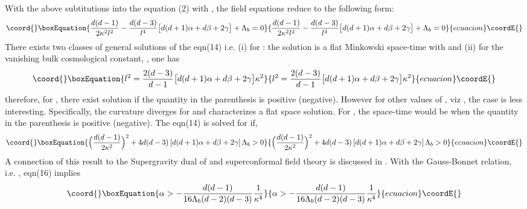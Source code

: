 \documentclass[a4paper,12pt]{article}
\begin{document}
With the above subtitutions into the equation (2) with \coordHE{}, 
the field equations reduce to the following form:
\begin{equation}\coord{}\boxEquation{
\frac{d(d-1)}{2\kappa^2 l^2}-\frac{d(d-3)}{l^4} \big[ d(d+1)\alpha+
d\beta+2\gamma \big]+\Lambda_b=0
}{
\frac{d(d-1)}{2\kappa^2 l^2}-\frac{d(d-3)}{l^4} \big[ d(d+1)\alpha+
d\beta+2\gamma \big]+\Lambda_b=0
}{ecuacion}\coordE{}\end{equation}
There exists two classes of general solutions of the eqn(14) i.e. 
(i) for \coordHE{} : the solution is a flat Minkowski space-time with 
\coordHE{} and
(ii) for the vanishing bulk cosmological constant, \coordHE{}, one has
\begin{equation}\coord{}\boxEquation{
l^2=\frac{2(d-3)}{d-1}\big[d(d+1)\alpha+d\beta+2\gamma\big]\kappa^2
}{
l^2=\frac{2(d-3)}{d-1}\big[d(d+1)\alpha+d\beta+2\gamma\big]\kappa^2
}{ecuacion}\coordE{}\end{equation}
therefore, for \coordHE{}, there exist \coordHE{} solution if the quantity
in the parenthesis is positive (negative). However for other values of 
\coordHE{}, viz \coordHE{}, the case is less interesting. Specifically, the curvature 
diverges for \coordHE{} and \coordHE{} characterizes a flat space solution. For \coordHE{}, 
the space-time would be \coordHE{} when the quantity in the parenthesis is 
positive (negative). The eqn(14) is solved for \coordHE{} if,
\begin{equation}\coord{}\boxEquation{
\Big(\frac{d(d-1)}{2\kappa^2}\Big)^2+
4d(d-3)\left[d(d+1)\alpha+d\beta+2\gamma\right]\Lambda_b>0
}{
\Big(\frac{d(d-1)}{2\kappa^2}\Big)^2+
4d(d-3)\left[d(d+1)\alpha+d\beta+2\gamma\right]\Lambda_b>0
}{ecuacion}\coordE{}\end{equation}
A connection of this result to the Supergravity dual of 
\coordHE{} and superconformal field theory is discussed in 
\cite{NOJ}. With the Gauss-Bonnet relation, 
i.e. \coordHE{}, eqn(16) implies 
\begin{equation}\coord{}\boxEquation{
\alpha>-\frac{d(d-1)}{16\Lambda_b(d-2)(d-3)} \frac{1}{\kappa^4}
}{
\alpha>-\frac{d(d-1)}{16\Lambda_b(d-2)(d-3)} \frac{1}{\kappa^4}
}{ecuacion}\coordE{}\end{equation}
\end{document}
